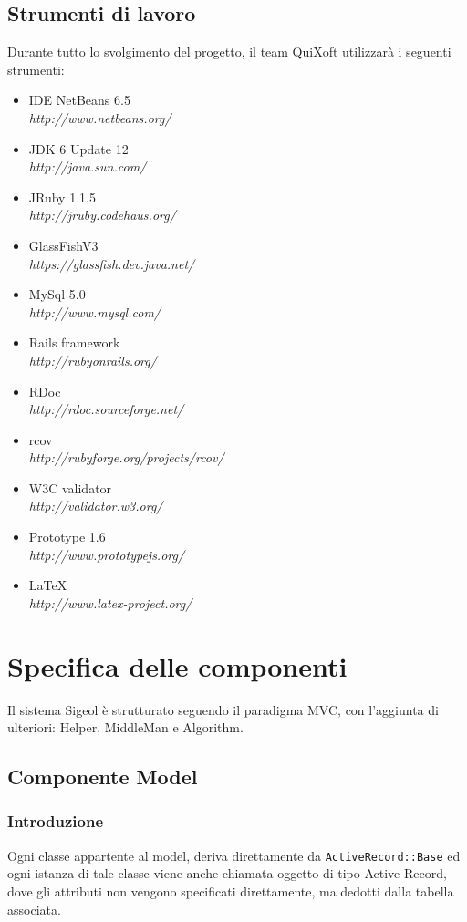 \documentclass[11pt,a4paper]{article}
\begin{document}
\subsection{Strumenti di lavoro}
Durante tutto lo svolgimento del progetto, il team QuiXoft utilizzarà i seguenti strumenti:
\begin{itemize}
 \item IDE NetBeans 6.5 \\ \textit{http://www.netbeans.org/}
 \item JDK 6 Update 12 \\ \textit{http://java.sun.com/}
 \item JRuby 1.1.5 \\ \textit{http://jruby.codehaus.org/}
 \item GlassFishV3 \\ \textit{https://glassfish.dev.java.net/}
 \item MySql 5.0 \\ \textit{http://www.mysql.com/}
 \item Rails framework \\ \textit{http://rubyonrails.org/}
 \item RDoc \\ \textit{http://rdoc.sourceforge.net/}
 \item rcov \\ \textit{http://rubyforge.org/projects/rcov/}
 \item W3C validator \\ \textit {http://validator.w3.org/}
 \item Prototype 1.6 \\ \textit {http://www.prototypejs.org/}
 \item \LaTeX \\ \textit {http://www.latex-project.org/}
\end{itemize}

\section{Specifica delle componenti}
Il sistema Sigeol è strutturato seguendo il paradigma MVC, con l'aggiunta di ulteriori: Helper, MiddleMan e Algorithm.
\subsection{Componente Model}\label{model}
\subsubsection{Introduzione}
Ogni classe appartente al model, deriva direttamente da \verb|ActiveRecord::Base| ed ogni istanza di tale classe viene anche chiamata oggetto di tipo Active Record, dove gli attributi non vengono specificati direttamente, ma dedotti dalla tabella associata.
\end{document}

